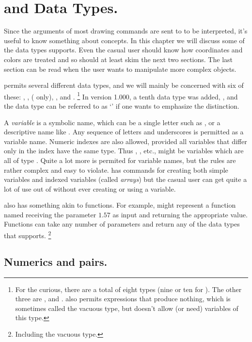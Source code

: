 \documentclass[letterpaper]{article}
\begin{document}
\clearpage
\chapter{\CMF{} and \CMP{} Data Types.}\label{types}

Since the arguments of most \mfp{} drawing commands are sent to \MF{} to
be interpreted, it's useful to know something about \MF{} concepts. In
this chapter we will discuss some of the data types \MF{} supports.
Even the casual user should know how coordinates and colors are treated
and so should at least skim the next two sections. The last
section can be read when the user wants to manipulate more complex
objects.

\CMF{} permits  several different data types, and we will mainly be
concerned with six of these: , ,  (\MP{}
only), ,  and .%
    \footnote{For the curious, there are a total of eight types (nine or
    ten for \MP{}). The other three are ,  and
    . \MF{} also permits expressions that produce nothing, which
    is sometimes called the vacuous type, but doesn't allow (or need)
    variables of this type.}
In \MP{} version 1.000, a tenth data type was added, , and
the  data type can be referred to as `' if one
wants to emphasize the distinction.

A \emph{variable} is a symbolic name, which can be a single letter such
as , or a descriptive name like . Any sequence of
letters and underscores is permitted as a variable name. Numeric indexes
are also allowed, provided all variables that differ only in the index
have the same type. Thus , , etc., might be variables
which are all of type . Quite a lot more is permited for variable
names, but the rules are rather complex and easy to violate. \Mfp{} has
commands for creating both simple variables and indexed variables
(called \emph{arrays}) but the casual user can get quite a lot of use
out of \mfp{} without ever creating or using a \MF{} variable.

\CMF{} also has something akin to functions. For example, 
might represent a function named  receiving the parameter
$1.57$ as input and returning the appropriate value. Functions
can take any number of parameters and return any of the data types that
\MF{} supports.%
    \footnote{Including the vacuous type.}


\section{Numerics and pairs.}\label{pairs}
\end{document}
